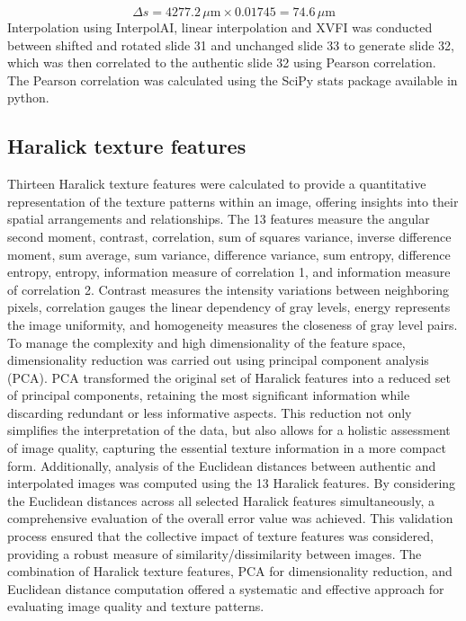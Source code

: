 \begin{refsection}
    \begin{equation}
        \Delta s = 4277.2 \, \mu\text{m} \times 0.01745 = 74.6 \, \mu\text{m}
    \end{equation}
    Interpolation using InterpolAI, linear interpolation and XVFI was conducted between shifted and rotated slide 31 and unchanged slide 33 to generate slide 32, which was then correlated to the authentic slide 32 using Pearson correlation. The Pearson correlation was calculated using the SciPy stats package available in python.  
    
    \subsection{Haralick texture features}
    Thirteen Haralick texture features were calculated to provide a quantitative representation of the texture patterns within an image, offering insights into their spatial arrangements and relationships\cite{brynolfsson2017a,haralick1973a}. The 13 features measure the angular second moment, contrast, correlation, sum of squares variance, inverse difference moment, sum average, sum variance, difference variance, sum entropy, difference entropy, entropy, information measure of correlation 1, and information measure of correlation 2\cite{brynolfsson2017a,haralick1973a}. Contrast measures the intensity variations between neighboring pixels, correlation gauges the linear dependency of gray levels, energy represents the image uniformity, and homogeneity measures the closeness of gray level pairs.
    To manage the complexity and high dimensionality of the feature space, dimensionality reduction was carried out using principal component analysis (PCA). PCA transformed the original set of Haralick features into a reduced set of principal components, retaining the most significant information while discarding redundant or less informative aspects. This reduction not only simplifies the interpretation of the data, but also allows for a holistic assessment of image quality, capturing the essential texture information in a more compact form.
    Additionally, analysis of the Euclidean distances between authentic and interpolated images was computed using the 13 Haralick features. By considering the Euclidean distances across all selected Haralick features simultaneously, a comprehensive evaluation of the overall error value was achieved. This validation process ensured that the collective impact of texture features was considered, providing a robust measure of similarity/dissimilarity between images. The combination of Haralick texture features, PCA for dimensionality reduction, and Euclidean distance computation offered a systematic and effective approach for evaluating image quality and texture patterns.

\end{refsection}
